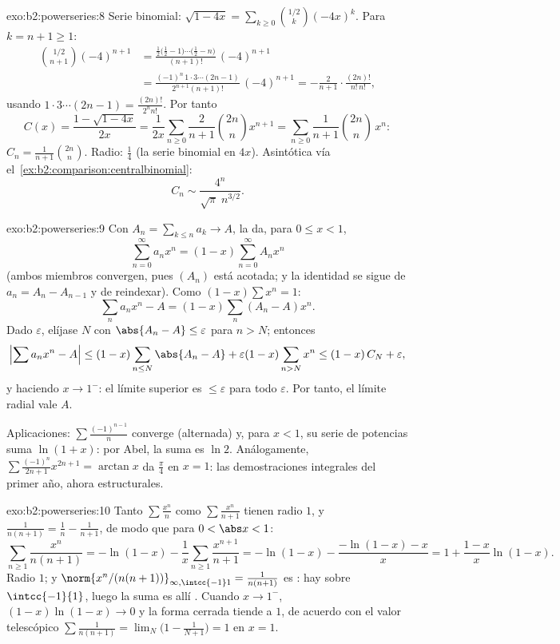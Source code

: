 \begin{solution}{exo:b2:powerseries:8}
Serie binomial: $\sqrt{1-4x} = \sum_{k\geq0}
\binom{1/2}{k}(-4x)^k$. Para $k = n + 1 \geq 1$:
\begin{align*}
\binom{1/2}{n+1}(-4)^{n+1}
&= \frac{\frac12\bigl(\frac12 - 1\bigr)\cdots\bigl(\frac12 -
n\bigr)}{(n+1)!}\,(-4)^{n+1}\\
&= \frac{(-1)^n\,1\cdot3\cdots(2n-1)}{2^{n+1}(n+1)!}\,(-4)^{n+1}
= -\frac{2}{n+1}\cdot\frac{(2n)!}{n!\,n!} ,
\end{align*}
usando $1\cdot3\cdots(2n-1) = \frac{(2n)!}{2^n n!}$. Por tanto
\[
C(x) = \frac{1 - \sqrt{1-4x}}{2x}
= \frac{1}{2x}\sum_{n\geq0}\frac{2}{n+1}\binom{2n}{n}x^{n+1}
= \sum_{n\geq0} \frac{1}{n+1}\binom{2n}{n}\,x^n :
\]
$C_n = \frac{1}{n+1}\binom{2n}{n}$. Radio: $\frac14$ (la serie
binomial en $4x$). Asintótica vía el~\cref{ex:b2:comparison:centralbinomial}:
\[
C_n \sim \frac{4^n}{\sqrt{\pi}\; n^{3/2}} .
\]
\end{solution}

\begin{solution}{exo:b2:powerseries:9}
Con $A_n = \sum_{k \leq n} a_k \to A$, la  da, para
$0 \leq x < 1$,
\[
\sum_{n=0}^{\infty} a_n x^n = (1 - x)\sum_{n=0}^{\infty} A_n x^n
\]
(ambos miembros convergen, pues $(A_n)$ está acotada; y la identidad
se sigue de $a_n = A_n - A_{n-1}$ y de reindexar). Como $(1 -
x)\sum x^n = 1$:
\[
\sum_n a_nx^n - A = (1-x)\sum_{n} (A_n - A)x^n .
\]
Dado $\varepsilon$, elíjase $N$ con $\abs{A_n - A} \leq
\varepsilon$ para $n > N$; entonces
\[
\Bigl|\sum a_nx^n - A\Bigr|
\leq (1-x)\sum_{n \leq N}\abs{A_n - A} + \varepsilon(1 -
x)\sum_{n > N}x^n
\leq (1-x)\,C_N + \varepsilon ,
\]
y haciendo $x \to 1^-$: el límite superior es $\leq \varepsilon$
para todo $\varepsilon$. Por tanto, el límite radial vale $A$.

Aplicaciones: $\sum \frac{(-1)^{n-1}}{n}$ converge (alternada) y,
para $x < 1$, su serie de potencias suma $\ln(1 + x)$: por Abel, la
suma es $\ln 2$. Análogamente, $\sum\frac{(-1)^n}{2n+1}x^{2n+1} =
\arctan x$ da $\frac\pi4$ en $x = 1$: las demostraciones integrales
del primer año, ahora estructurales.
\end{solution}

\begin{solution}{exo:b2:powerseries:10}
Tanto $\sum\frac{x^n}{n}$ como $\sum\frac{x^n}{n+1}$ tienen radio
$1$, y $\frac{1}{n(n+1)} = \frac1n - \frac1{n+1}$, de modo que para
$0 < \abs x < 1$:
\[
\sum_{n\geq1}\frac{x^n}{n(n+1)}
= -\ln(1-x) - \frac1x\sum_{n\geq1}\frac{x^{n+1}}{n+1}
= -\ln(1-x) - \frac{-\ln(1-x) - x}{x}
= 1 + \frac{1-x}{x}\ln(1-x) .
\]
Radio $1$; y $\norm{x^n/(n(n+1))}_{\infty,\intcc{-1}1} =
\frac{1}{n(n+1)}$ es : hay  sobre
$\intcc{-1}{1}$, luego la suma es allí . Cuando $x \to
1^-$, $(1-x)\ln(1-x) \to 0$ y la forma cerrada tiende a $1$, de
acuerdo con el valor telescópico $\sum\frac{1}{n(n+1)} = \lim_N\bigl(1
- \frac{1}{N+1}\bigr) = 1$ en $x = 1$.
\end{solution}

